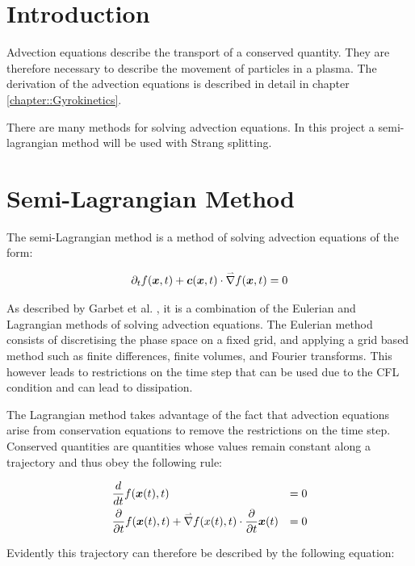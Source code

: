 
\section{Introduction}

Advection equations describe the transport of a conserved quantity. They are therefore necessary to describe the movement of particles in a plasma. The derivation of the advection equations is described in detail in chapter \ref{chapter::Gyrokinetics}.

There are many methods for solving advection equations. In this project a semi-lagrangian method will be used with Strang splitting. 

\section{Semi-Lagrangian Method}

The semi-Lagrangian method is a method of solving advection equations of the form:

\begin{equation}
 \partial_t f(\boldsymbol{x},t) + \boldsymbol{c}(\boldsymbol{x},t) \cdot \accentset{\rightharpoonup}{\nabla} f(\boldsymbol{x},t) = 0
\end{equation}

As described by Garbet et al. \cite{GyrokineticSimulations}, it is a combination of the Eulerian and Lagrangian methods of solving advection equations. The Eulerian method consists of discretising the phase space on a fixed grid, and applying a grid based method such as finite differences, finite volumes, and Fourier transforms. This however leads to restrictions on the time step that can be used due to the CFL condition and can lead to dissipation.

The Lagrangian method takes advantage of the fact that advection equations arise from conservation equations to remove the restrictions on the time step. Conserved quantities are quantities whose values remain constant along a trajectory and thus obey the following rule:

\begin{align}
 &\frac{d}{dt} f(\boldsymbol{x}(t),t) &= 0\\
 &\frac{\partial}{\partial t} f(\boldsymbol{x}(t),t) + \accentset{\rightharpoonup}{\nabla} f(x(t),t) \cdot \frac{\partial}{\partial t}\boldsymbol{x}(t) &= 0
\end{align}

Evidently this trajectory can therefore be described by the following equation:

